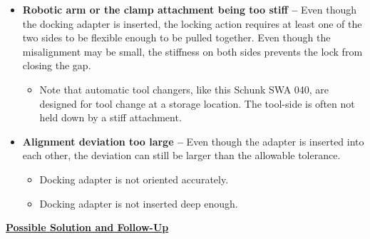 \begin{itemize}
	\item \textbf{Robotic arm or the clamp attachment being too stiff --} Even though the docking adapter is inserted, the locking action requires at least one of the two sides to be flexible enough to be pulled together. Even though the misalignment may be small, the stiffness on both sides prevents the lock from closing the gap.

\begin{itemize}
	\item Note that automatic tool changers, like this Schunk SWA 040, are designed for tool change at a storage location. The tool-side is often not held down by a stiff attachment.

\end{itemize}
	\item \textbf{Alignment deviation too large --} Even though the adapter is inserted into each other, the deviation can still be larger than the allowable tolerance.

\begin{itemize}
	\item Docking adapter is not oriented accurately.

	\item Docking adapter is not inserted deep enough.

\end{itemize}
\end{itemize}
\textbf{\ul{Possible Solution and Follow-Up}}

